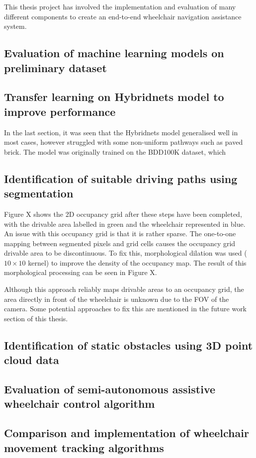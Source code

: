 This thesis project has involved the implementation and evaluation
of many different components to create an end-to-end wheelchair
navigation assistance system.

\subsection{Evaluation of machine learning models on preliminary dataset}

\subsection{Transfer learning on Hybridnets model to improve performance}
In the last section, it was seen that the Hybridnets model generalised well in most cases,
however struggled with some non-uniform pathways such as paved brick.
The model was originally trained on the BDD100K dataset, which 

\pagebreak
\subsection{Identification of suitable driving paths using segmentation}

Figure X shows the 2D occupancy grid after these steps have been completed,
with the drivable area labelled in green and the wheelchair represented in blue.
An issue with this occupancy grid is that it is rather sparse. The one-to-one
mapping between segmented pixels and grid cells causes the occupancy grid
drivable area to be discontinuous. To fix this, morphological dilation
was used ($10\times 10$ kernel) to improve the density of the occupancy map.
The result of this morphological processing can be seen in Figure X.

Although this approach reliably maps drivable areas to an occupancy grid,
the area directly in front of the wheelchair is unknown due to the FOV of the camera.
Some potential approaches to fix this are mentioned in the future work section of this thesis.

\subsection{Identification of static obstacles using 3D point cloud data}


\subsection{Evaluation of semi-autonomous assistive wheelchair control algorithm}

\subsection{Comparison and implementation of wheelchair movement tracking algorithms}
